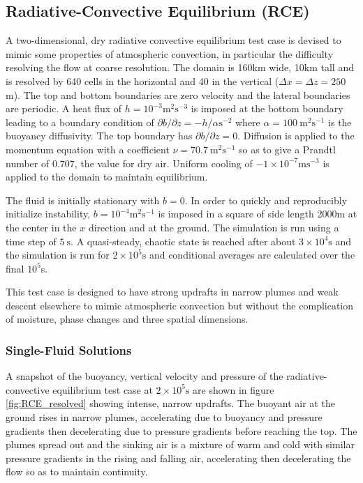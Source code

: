 \documentclass[draft]{agujournal2019}
\begin{document}
\subsection{Radiative-Convective Equilibrium (RCE)}

A two-dimensional, dry radiative convective equilibrium test case
is devised to mimic some properties of atmospheric convection, in
particular the difficulty resolving the flow at coarse resolution.
The domain is 160km wide, 10km tall and is resolved by 640 cells in
the horizontal and 40 in the vertical ($\Delta x=\Delta z=250$m).
The top and bottom boundaries are zero velocity and the lateral boundaries
are periodic. A heat flux of $h=10^{-3}\text{m}^{2}\text{s}^{-3}$
is imposed at the bottom boundary leading to a boundary condition
of $\partial b/\partial z=-h/\alpha\text{s}^{-2}$ where $\alpha=100\ \text{m}^{2}\text{s}^{-1}$
is the buoyancy diffusivity. The top boundary has $\partial b/\partial z=0$.
Diffusion is applied to the momentum equation with a coefficient $\nu=70.7\ \text{m}^{2}\text{s}^{-1}$
so as to give a Prandtl number of $0.707$, the value for dry air. Uniform cooling of $-1\times10^{-7}\text{m}\text{s}^{-3}$ is applied to the domain to maintain equilibrium.

The fluid is initially stationary with $b=0$. In order to quickly
and reproducibly initialize instability, $b=10^{-4}\text{m}^{2}\text{s}^{-1}$
is imposed in a square of side length 2000m at the center in the $x$
direction and at the ground. The simulation is run using a time step
of $5\ \text{s}$. A quasi-steady, chaotic state is reached after
about $3\times10^{4}\text{s}$ and the simulation is run for $2\times10^{5}\text{s}$
and conditional averages are calculated over the final $10^{5}$s.

This test case is designed to have strong updrafts in narrow plumes
and weak descent elsewhere to mimic atmospheric convection but without
the complication of moisture, phase changes and three spatial dimensions.

\subsubsection{Single-Fluid Solutions}

A snapshot of the buoyancy, vertical velocity and pressure of the
radiative-convective equilibrium test case at $2\times10^{5}\text{s}$
are shown in figure \ref{fig:RCE_resolved} showing intense, narrow
updrafts. The buoyant air at the ground rises in narrow plumes,
accelerating due to buoyancy and pressure gradients then decelerating
due to pressure gradients before reaching the top. The plumes spread
out and the sinking air is a mixture of warm and cold with similar
pressure gradients in the rising and falling air, accelerating then
decelerating the flow so as to maintain continuity. 
\end{document}
